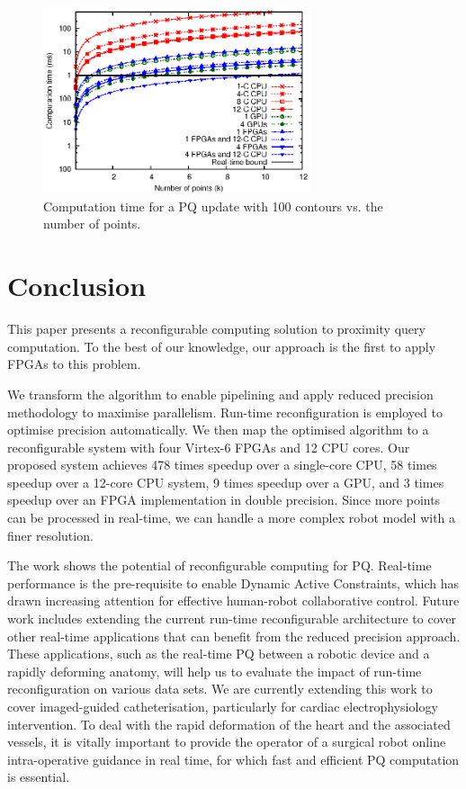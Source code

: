 \begin{figure}[ht]
\begin{center}
\includegraphics[width=0.7\textwidth]{mixed_precision/figures/fig_scalability}
\end{center}
\caption{Computation time for a PQ update with 100 contours vs. the number of points.}
\label{fig:scalability}
\end{figure}

\section{Conclusion}
\label{sec:conclusion}

This paper presents a reconfigurable computing solution to proximity query computation.
To the best of our knowledge, our approach is the first to apply FPGAs to this problem.

We transform the algorithm to enable pipelining and apply reduced precision methodology to maximise parallelism.
Run-time reconfiguration is employed to optimise precision automatically.
We then map the optimised algorithm to a reconfigurable system with four Virtex-6 FPGAs and 12 CPU cores.
Our proposed system achieves 478 times speedup over a single-core CPU, 58 times speedup over a 12-core CPU system, 9 times speedup over a GPU,
and 3 times speedup over an FPGA implementation in double precision.
Since more points can be processed in real-time, we can handle a more complex robot model with a finer resolution.

The work shows the potential of reconfigurable computing for PQ. 
Real-time performance is the pre-requisite to enable Dynamic Active Constraints, which has drawn increasing attention for effective human-robot collaborative control. 
Future work includes extending the current run-time reconfigurable architecture to cover other real-time applications that can benefit from the reduced precision approach. 
These applications, such as the real-time PQ between a robotic device and a rapidly deforming anatomy, will help us to evaluate the impact of run-time reconfiguration on various data sets. 
We are currently extending this work to cover imaged-guided catheterisation, particularly for cardiac electrophysiology intervention. 
To deal with the rapid deformation of the heart and the associated vessels, it is vitally important to provide the operator of a surgical robot online intra-operative guidance in real time, for which fast and efficient PQ computation is essential.

